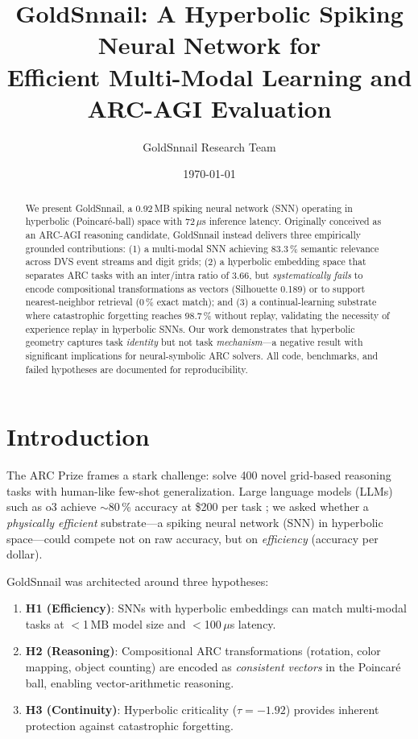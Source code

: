 \documentclass[11pt,a4paper]{article}
\title{\textbf{GoldSnnail}: A Hyperbolic Spiking Neural Network for\\Efficient Multi-Modal Learning and ARC-AGI Evaluation}
\author{GoldSnnail Research Team}
\date{\today}
\begin{document}
\maketitle

\begin{abstract}
\noindent
We present GoldSnnail, a 0.92\,MB spiking neural network (SNN) operating in hyperbolic (Poincaré-ball) space with 72\,$\mu$s inference latency. Originally conceived as an ARC-AGI reasoning candidate, GoldSnnail instead delivers three empirically grounded contributions: (1) a multi-modal SNN achieving 83.3\,\% semantic relevance across DVS event streams and digit grids; (2) a hyperbolic embedding space that separates ARC tasks with an inter/intra ratio of 3.66, but \emph{systematically fails} to encode compositional transformations as vectors (Silhouette 0.189) or to support nearest-neighbor retrieval (0\,\% exact match); and (3) a continual-learning substrate where catastrophic forgetting reaches 98.7\,\% without replay, validating the necessity of experience replay in hyperbolic SNNs. Our work demonstrates that hyperbolic geometry captures task \emph{identity} but not task \emph{mechanism}---a negative result with significant implications for neural-symbolic ARC solvers. All code, benchmarks, and failed hypotheses are documented for reproducibility.
\end{abstract}

\section{Introduction}
\label{sec:intro}

The ARC Prize \cite{arc_prize} frames a stark challenge: solve 400 novel grid-based reasoning tasks with human-like few-shot generalization. Large language models (LLMs) such as o3 achieve $\sim$80\,\% accuracy at \$200 per task \cite{o3_arc}; we asked whether a \emph{physically efficient} substrate---a spiking neural network (SNN) in hyperbolic space---could compete not on raw accuracy, but on \emph{efficiency} (accuracy per dollar).

GoldSnnail was architected around three hypotheses:
\begin{enumerate}
    \item \textbf{H1 (Efficiency)}: SNNs with hyperbolic embeddings can match multi-modal tasks at $<$1\,MB model size and $<$100\,$\mu$s latency.
    \item \textbf{H2 (Reasoning)}: Compositional ARC transformations (rotation, color mapping, object counting) are encoded as \emph{consistent vectors} in the Poincaré ball, enabling vector-arithmetic reasoning.
    \item \textbf{H3 (Continuity)}: Hyperbolic criticality ($\tau = -1.92$) provides inherent protection against catastrophic forgetting.
\end{enumerate}
\end{document}
